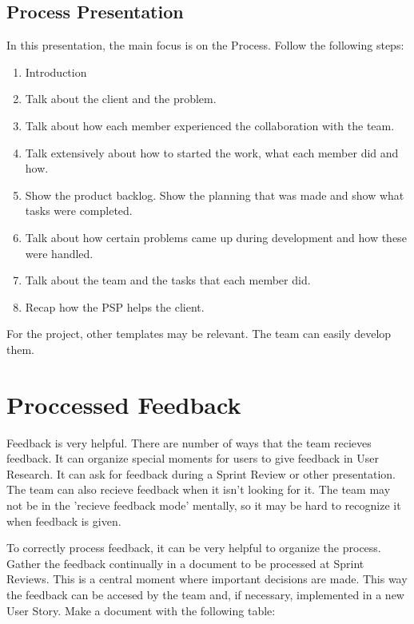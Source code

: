 \documentclass[10pt]{report}
\begin{document}
\subsection{Process Presentation}

In this presentation, the main focus is on the Process. Follow the following steps:

\begin{enumerate}
	\item Introduction
	\item Talk about the client and the problem.
	\item Talk about how each member experienced the collaboration with the team.
	\item Talk extensively about how to started the work, what each member did and how.
	\item Show the product backlog. Show the planning that was made and show what tasks were completed.
	\item Talk about how certain problems came up during development and how these were handled.
	\item Talk about the team and the tasks that each member did.
	\item Recap how the PSP helps the client.
\end{enumerate}

\noindent For the project, other templates may be relevant. The team can easily develop them.

\newpage

\section{Proccessed Feedback}

Feedback is very helpful. There are number of ways that the team recieves feedback. It can organize special moments for users to give feedback in User Research. It can ask for feedback during a Sprint Review or other presentation. The team can also recieve feedback when it isn't looking for it. The team may not be in the 'recieve feedback mode' mentally, so it may be hard to recognize it when feedback is given.

\medskip

\noindent To correctly process feedback, it can be very helpful to organize the process. Gather the feedback continually in a document to be processed at Sprint Reviews. This is a central moment where important decisions are made. This way the feedback can be accesed by the team and, if necessary, implemented in a new User Story. Make a document with the following table:
\end{document}
